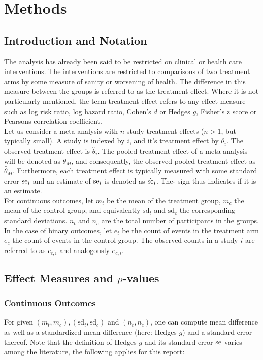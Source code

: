 \documentclass[11pt,a4paper,twoside]{book}\usepackage[]{graphicx}\usepackage[]{color}
\begin{document}




\chapter{Methods} \label{ch:methods}
\section{Introduction and Notation}
The analysis has already been said to be restricted on clinical or health care interventions. The interventions are restricted to comparisons of two treatment arms by some measure of sanity or worsening of health. The difference in this measure between the groups is referred to as the treatment effect. Where it is not particularly mentioned, the term treatment effect refers to any effect measure such as log risk ratio, log hazard ratio, Cohen's $d$ or Hedges $g$, Fisher's z score or Pearsons correlation coefficient. \\
Let us consider a meta-analysis with $n$ study treatment effects ($n > 1$, but typically small). A study is indexed by $i$, and it's treatment effect by  $\theta_i$. The observed treatment effect is $\hat{\theta}_i$. The pooled treatment effect of a meta-analysis will be denoted as $\theta_M$, and consequently, the observed pooled treatment effect as $\hat{\theta}_M$. Furthermore, each treatment effect is typically measured with some standard error $\operatorname{se}_i$ and an estimate of $\operatorname{se}_i$ is denoted as $\hat{\operatorname{se}}_i$. The $\hat{}$ sign thus indicates if it is an estimate.\\
For continuous outcomes, let $m_t$ be the mean of the treatment group, $m_c$ the mean of the control group, and equivalently $\textrm{sd}_t$ and $\textrm{sd}_c$ the corresponding standard deviations. $n_t$ and $n_c$ are the total number of participants in the groups.
In the case of binary outcomes, let $e_t$ be the count of events in the treatment arm $e_c$ the count of events in the control group. The observed counts in a study $i$ are referred to as $e_{t,i}$ and analogously $e_{c,i}$.

\section{Effect Measures and $p$-values}
\subsection{Continuous Outcomes}
For given $(m_t, m_c), (\textrm{sd}_t, \textrm{sd}_c)$ and $(n_t, n_c)$, one can compute mean difference as well as a standardized mean difference (here: Hedges $g$) and  a standard error thereof. Note that the definition of Hedges $g$ and its standard error $\operatorname{se}$ varies among the literature, the following applies for this report:
\end{document}
